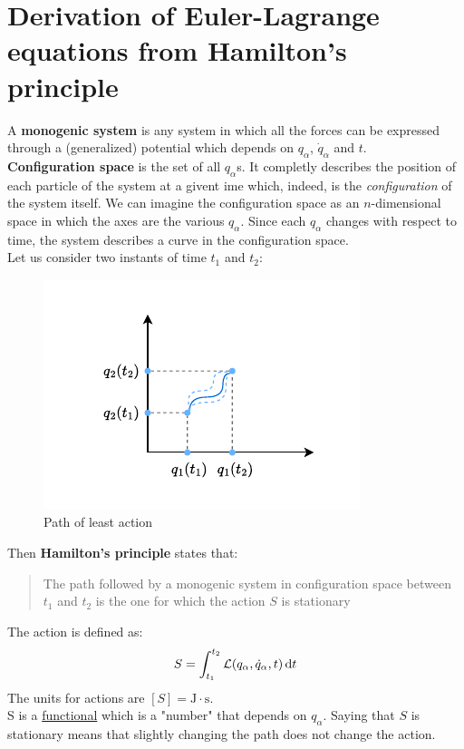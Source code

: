 \section{Derivation of Euler-Lagrange equations from Hamilton's principle}
A \textbf{monogenic system} is any system in which all the forces can be expressed through a (generalized) potential which depends on $q_{\alpha}$, $\dot{q}_{\alpha}$ and $t$.\\
\textbf{Configuration space} is the set of all $q_{\alpha}$s. It completly describes the position of each particle of the system at a givent ime which, indeed, is the \textit{configuration} of the system itself. We can imagine the configuration space as an $n$-dimensional space in which the axes are the various $q_{\alpha}$.
Since each $q_{\alpha}$ changes with respect to time, the system describes a curve in the configuration space.\\
Let us consider two instants of time $t_1$ and $t_2$:
\begin{figure}[H]
    \centering
    \includegraphics[width=0.6\linewidth]{res/svg/leastactionpath.drawio}
    \caption{Path of least action}
    \label{fig:image9}
\end{figure}
Then \textbf{Hamilton's principle} states that:
\begin{quote} \label{q:Hamilton_principle_quote} %
    The path followed by a monogenic system in configuration space between $t_1$ and $t_2$ is the one for which the action $S$ is stationary
\end{quote}
The action is defined as:
\begin{equation}
    S = \int_{t_1}^{t_2}\mathcal{L}(q_{\alpha},\dot{q}_{\alpha},t) \dd{t}
\end{equation}
The units for actions are $[S] = \mathrm{J\cdot s}$.\\S is a \underline{functional} which is a "number" that depends on $q_{\alpha}$. Saying that $S$ is stationary means that slightly changing the path does not change the action.\\
